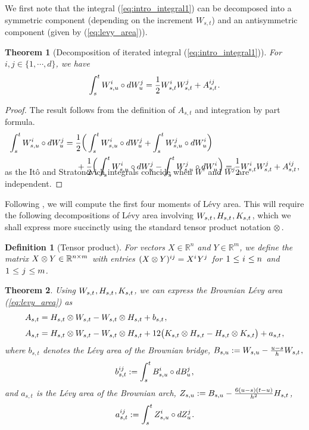 \documentclass[sn-mathphys-num]{sn-jnl}%
\newtheorem{theorem}{Theorem}%
\newtheorem{definition}{Definition}%
\newcommand{\R}{\mathbb{R}}
\newcommand{\m}{\hspace{0.25mm}}
\newcommand{\mm}{\hspace{5mm}}
\begin{document}
We first note that the integral (\ref{eq:intro_integral1}) can be decomposed into a symmetric component (depending on the increment $W_{s,t}$) and an antisymmetric component (given by (\ref{eq:levy_area})). \medbreak
\begin{theorem}[Decomposition of iterated integral (\ref{eq:intro_integral1})]\label{thm:levy_area_relation}For $i,j\in\{1,\cdots,d\}$, we have
\begin{align}\label{eq:levy_area_relation}
\int_s^t W_{s,u}^i \circ dW_u^j = \frac{1}{2} W_{s,t}^i W_{s,t}^j + A_{s,t}^{ij}\m.
\end{align}
\end{theorem}
\begin{proof}
The result follows from the definition of $A_{s,t}$ and integration by part formula.\vspace{-1.5mm}
\begin{align*}
\int_s^t W_{s,u}^i \circ dW_u^j & = \frac{1}{2}\bigg(\int_s^t W_{s,u}^i \circ dW_u^j + \int_s^t W_{s,u}^j \circ dW_u^i \bigg)\\
&\mm + \frac{1}{2}\bigg(\int_s^t W_{s,u}^i \circ dW_u^j - \int_s^t W_{s,u}^j \circ dW_u^i \bigg) = \frac{1}{2} W_{s,t}^i W_{s,t}^j + A_{s,t}^{ij}\m,\\[-20pt]
\end{align*}
as the It\^{o} and Stratonovich integrals coincide when $W^i$ and $W^j$ are independent.
\end{proof}
Following \cite[Chapter 7]{foster2020thesis}, we will compute the first four moments of L\'{e}vy area. This will require the following decompositions of L\'{e}vy area involving $W_{s,t}\m, H_{s,t}\m, K_{s,t}\m$,
which we shall express more succinctly using the standard tensor product notation $\otimes\,$.\medbreak
\begin{definition}[Tensor product]	 
For vectors $X\in\R^n$ and $Y\in\R^m$, we define the matrix $X\otimes Y\in \R^{n\times m}\m$ with entries $\m(X\otimes Y)^{ij} = X^i\m Y^j\m$ for $\m 1\m\leq\m i\m\leq n\m$ and $\m 1\m\leq\m j\m\leq m$.
\end{definition}\medbreak
\begin{theorem}\label{thm:levy_decomp}
Using $W_{s,t}\m, H_{s,t}\m, K_{s,t}$, we can express the Brownian L\'{e}vy area (\ref{eq:levy_area}) as
\begin{align}
A_{s,t} & = H_{s,t}\otimes W_{s,t} - W_{s,t}\otimes H_{s,t} + b_{s,t}\m,\label{eq:levy_area_decomp_1}\\[3pt]
A_{s,t} & = H_{s,t}\otimes W_{s,t} - W_{s,t}\otimes H_{s,t} + 12\big(K_{s,t}\otimes H_{s,t} - H_{s,t}\otimes K_{s,t}\big) + a_{s,t}\m,\label{eq:levy_area_decomp_2}
\end{align}
where $b_{s,t}$ denotes the L\'{e}vy area of the Brownian bridge, $B_{s,u} := W_{s,u} - \frac{u-s}{h}W_{s,t}\m,$
\begin{align*}
b_{s,t}^{ij} := \int_s^t B_{s,u}^i \circ dB_u^j\m,
\end{align*}
and $a_{s,t}$ is the L\'{e}vy area of the Brownian arch, $Z_{s,u} := B_{s,u} - \frac{6(u-s)(t-u)}{h^2}H_{s,t}\m$,
\begin{align*}
a_{s,t}^{ij} := \int_s^t Z_{s,u}^i \circ dZ_u^j\m.
\end{align*}
\end{theorem}
\end{document}
